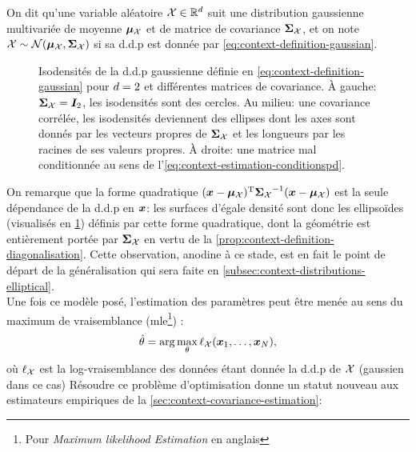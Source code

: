 \begin{definition}
  On dit qu'une variable aléatoire $\mathcal{X}\in\mathbb{R}^d$ suit une distribution gaussienne multivariée de moyenne $\boldsymbol{\mu}_{\mathcal{X}}$ et de matrice de covariance $\boldsymbol{\Sigma}_{\mathcal{X}}$, et on note $\mathcal{X}\sim\mathcal{N}(\boldsymbol{\mu}_{\mathcal{X}}, \boldsymbol{\Sigma}_{\mathcal{X}})$ si sa d.d.p est donnée par \cref{eq:context-definition-gaussian}.
\end{definition}

\begin{figure}[h]
  \begin{center}
    
  \end{center}
  \provGaussisocontoursQR[.5cm]
  \caption{Isodensités de la d.d.p gaussienne définie en \cref{eq:context-definition-gaussian} pour $d=2$ et différentes matrices de covariance. À gauche: $\boldsymbol{\Sigma}_{\mathcal{X}}=\boldsymbol{I}_{2}$, les isodensités sont des cercles. Au milieu: une covariance corrélée, les isodensités deviennent des ellipses dont les axes sont donnés par les vecteurs propres de $\boldsymbol{\Sigma}_{\mathcal{X}}$ et les longueurs par les racines de ses valeurs propres. À droite: une matrice mal conditionnée au sens de l'\cref{eq:context-estimation-conditionspd}. \provGaussisocontours}
  \label{fig:context-distributions-gaussisocontours}
\end{figure}

On remarque que la forme quadratique $(\boldsymbol{x}-\boldsymbol{\mu}_{\mathcal{X}})^{\mathrm{T}} {\boldsymbol{\Sigma}_{\mathcal{X}}}^{-1} (\boldsymbol{x}-\boldsymbol{\mu}_{\mathcal{X}})$ est la seule dépendance de la d.d.p en $\boldsymbol{x}$: les surfaces d'égale densité sont donc les ellipsoïdes (visualisés en \cref{fig:context-distributions-gaussisocontours}) définis par cette forme quadratique, dont la géométrie est entièrement portée par $\boldsymbol{\Sigma}_{\mathcal{X}}$ en vertu de la \cref{prop:context-definition-diagonalisation}. Cette observation, anodine à ce stade, est en fait le point de départ de la généralisation qui sera faite en \cref{subsec:context-distributions-elliptical}. \\


Une fois ce modèle posé, l'estimation des paramètres peut être menée au sens du maximum de vraisemblance (mle\footnote{Pour \emph{Maximum likelihood Estimation} en anglais}) :
\begin{equation}
  \hat{\theta} = \arg \max_\theta \ell_{\mathcal{X}}(\boldsymbol{x}_1,\dots,\boldsymbol{x}_N),
\end{equation}
où $\ell_{\mathcal{X}}$ est la log-vraisemblance des données étant donnée la d.d.p de $\mathcal{X}$ (gaussien dans ce cas) Résoudre ce problème d'optimisation donne un statut nouveau aux estimateurs empiriques de la \cref{sec:context-covariance-estimation}:

